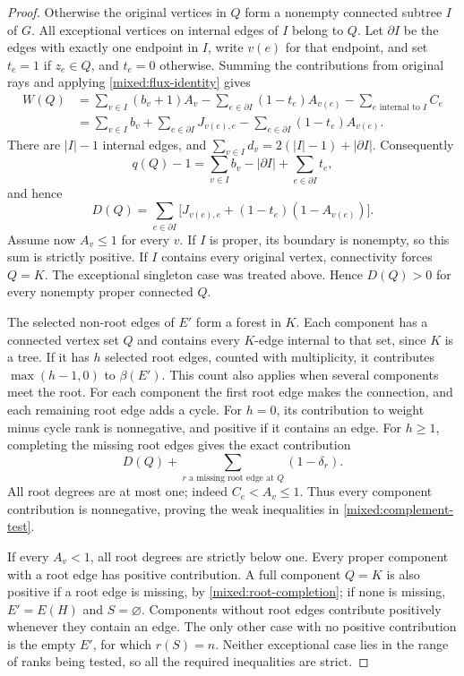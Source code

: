 \begin{proof}
Otherwise the original vertices in $Q$ form a nonempty connected subtree
$I$ of $G$. All exceptional vertices on internal edges of $I$ belong
to $Q$. Let $\partial I$ be the edges with exactly one endpoint in $I$,
write $v(e)$ for that endpoint, and set $t_e=1$ if $z_e\in Q$, and
$t_e=0$ otherwise. Summing the contributions from original rays and applying \eqref{mixed:flux-identity} gives
\begin{align*}
 W(Q)
 &=\sum_{v\in I}(b_v+1)A_v
   -\sum_{e\in\partial I}(1-t_e)A_{v(e)}
   -\sum_{e\text{ internal to }I}C_e\\
 &=\sum_{v\in I}b_v+\sum_{e\in\partial I}J_{v(e),e}
   -\sum_{e\in\partial I}(1-t_e)A_{v(e)}.
\end{align*}
There are $|I|-1$ internal edges, and
$\sum_{v\in I}d_v=2(|I|-1)+|\partial I|$. Consequently
\[
 q(Q)-1=\sum_{v\in I}b_v-|\partial I|+
                 \sum_{e\in\partial I}t_e,
\]
and hence
\begin{equation}\label{mixed:boundary-deficit}
 D(Q)=\sum_{e\in\partial I}
 \bigl[J_{v(e),e}+(1-t_e)(1-A_{v(e)})\bigr].
\end{equation}
Assume now $A_v\le1$ for every $v$. If $I$ is proper, its boundary is
nonempty, so this sum is strictly positive. If $I$ contains every original
vertex, connectivity forces $Q=K$. The exceptional singleton case was treated above. Hence $D(Q)>0$ for
every nonempty proper connected $Q$.

The selected non-root edges of $E'$ form a forest in $K$. Each component
has a connected vertex set $Q$ and contains every $K$-edge internal to
that set, since $K$ is a tree. If it has $h$ selected root edges, counted
with multiplicity, it contributes $\max(h-1,0)$ to $\beta(E')$. This count also applies when several components meet the root. For
each component the first root edge makes the connection, and each
remaining root edge adds a cycle. For $h=0$, its contribution to weight minus cycle rank is
nonnegative, and positive if it contains an edge. For $h\ge1$, completing
the missing root edges gives the exact contribution
\begin{equation}\label{mixed:root-completion}
 D(Q)+\sum_{r\text{ a missing root edge at }Q}(1-\delta_r).
\end{equation}
All root degrees are at most one; indeed $C_e<A_v\le1$. Thus every
component contribution is nonnegative, proving the weak inequalities
in \eqref{mixed:complement-test}.

If every $A_v<1$, all root degrees are strictly below one. Every proper component with a root edge has positive contribution. A full
component $Q=K$ is also positive if a root edge is missing, by
\eqref{mixed:root-completion}; if none is missing, $E'=E(H)$ and
$S=\varnothing$. Components without root edges contribute positively
whenever they contain an edge. The only other case with no positive contribution is the empty $E'$,
for which $r(S)=n$. Neither exceptional case lies in the range of ranks
being tested, so all the required inequalities are strict.


\end{proof}
